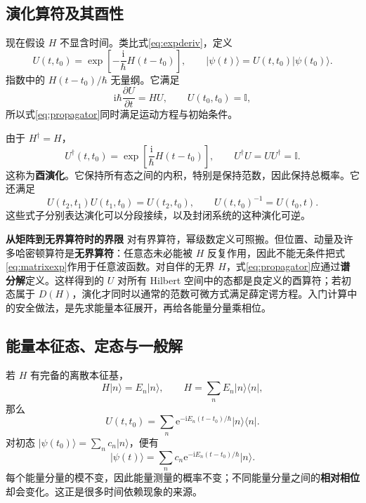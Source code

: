 \documentclass[a4paper,11pt]{article}
\numberwithin{equation}{section}
\newcommand{\ii}{\mathrm{i}}
\newcommand{\ee}{\mathrm{e}}
\newcommand{\I}{\mathbb I}
\newcommand{\ket}[1]{\lvert #1\rangle}
\newcommand{\bra}[1]{\langle #1\rvert}
\newcommand{\important}[1]{\par\noindent\textbf{#1}\quad}
\begin{document}
\subsection{演化算符及其酉性}
现在假设 $H$ 不显含时间。类比式\eqref{eq:expderiv}，定义
\begin{equation}\label{eq:propagator}
  \boxed{U(t,t_0)=\exp\left[-\frac{\ii}{\hbar}H(t-t_0)\right],
  \qquad\ket{\psi(t)}=U(t,t_0)\ket{\psi(t_0)}.}
\end{equation}
指数中的 $H(t-t_0)/\hbar$ 无量纲。它满足
\[
  \ii\hbar\frac{\partial U}{\partial t}=HU,\qquad
  U(t_0,t_0)=\I,
\]
所以式\eqref{eq:propagator}同时满足运动方程与初始条件。

由于 $H^\dagger=H$，
\begin{equation}
  U^\dagger(t,t_0)=\exp\left[\frac{\ii}{\hbar}H(t-t_0)\right],
  \qquad U^\dagger U=UU^\dagger=\I.
\end{equation}
这称为\textbf{酉演化}。它保持所有态之间的内积，特别是保持范数，因此保持总概率。它还满足
\begin{equation}
  U(t_2,t_1)U(t_1,t_0)=U(t_2,t_0),\qquad
  U(t,t_0)^{-1}=U(t_0,t).
\end{equation}
这些式子分别表达演化可以分段接续，以及封闭系统的这种演化可逆。

\important{从矩阵到无界算符时的界限}
对有界算符，幂级数定义可照搬。但位置、动量及许多哈密顿算符是\textbf{无界算符}：任意态未必能被 $H$ 反复作用，因此不能无条件把式\eqref{eq:matrixexp}作用于任意波函数。对自伴的无界 $H$，式\eqref{eq:propagator}应通过\textbf{谱分解}定义。这样得到的 $U$ 对所有 Hilbert 空间中的态都是良定义的酉算符；若初态属于 $D(H)$，演化才同时以通常的范数可微方式满足薛定谔方程。入门计算中的安全做法，是先求能量本征展开，再给各能量分量乘相位。

\subsection{能量本征态、定态与一般解}
若 $H$ 有完备的离散本征基，
\begin{equation}
  H\ket{n}=E_n\ket{n},\qquad
  H=\sum_n E_n\ket{n}\bra{n},
\end{equation}
那么
\begin{equation}\label{eq:Uspectral}
  U(t,t_0)=\sum_n\ee^{-\ii E_n(t-t_0)/\hbar}\ket{n}\bra{n}.
\end{equation}
对初态 $\ket{\psi(t_0)}=\sum_n c_n\ket{n}$，便有
\begin{equation}\label{eq:generalsolution}
  \boxed{\ket{\psi(t)}=\sum_n c_n
  \ee^{-\ii E_n(t-t_0)/\hbar}\ket{n}.}
\end{equation}
每个能量分量的模不变，因此能量测量的概率不变；不同能量分量之间的\textbf{相对相位}却会变化。这正是很多时间依赖现象的来源。
\end{document}
